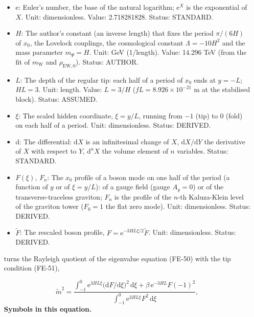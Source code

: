 \documentclass[
  10pt,
]{article}
\providecommand{\tightlist}{%
  \setlength{\itemsep}{0pt}\setlength{\parskip}{0pt}}
\begin{document}
\begin{itemize}
\tightlist
\item
  \(\mathrm{e}\): Euler's number, the base of the natural logarithm;
  \(\mathrm{e}^{X}\) is the exponential of \(X\). Unit: dimensionless.
  Value: 2.718281828. Status: STANDARD.
\item
  \(H\): The author's constant (an inverse length) that fixes the period
  \(\pi/(6H)\) of \(x_0\), the Lovelock couplings, the cosmological
  constant \(\Lambda = -10H^2\) and the mass parameter \(m_\Psi = H\).
  Unit: GeV (1/length). Value: 14.296 TeV (from the fit of
  \(m_{\mathrm{W}}\) and \(\rho_{\mathrm{EW},0}\)). Status: AUTHOR.
\item
  \(L\): The depth of the regular tip: each half of a period of \(x_0\)
  ends at \(y = -L\); \(HL = 3\). Unit: length. Value: \(L = 3/H\)
  (\(fL = 8.926\times10^{-21}\) m at the stabilised block). Status:
  ASSUMED.
\item
  \(\xi\): The scaled hidden coordinate, \(\xi = y/L\), running from
  \(-1\) (tip) to \(0\) (fold) on each half of a period. Unit:
  dimensionless. Status: DERIVED.
\item
  \(\mathrm{d}\): The differential: \(\mathrm{d}X\) is an infinitesimal
  change of \(X\), \(\mathrm{d}X/\mathrm{d}Y\) the derivative of \(X\)
  with respect to \(Y\), \(\mathrm{d}^nX\) the volume element of \(n\)
  variables. Status: STANDARD.
\item
  \(F(\xi),\ F_n\): The \(x_0\) profile of a boson mode on one half of
  the period (a function of \(y\) or of \(\xi = y/L\)): of a gauge field
  (gauge \(A_y = 0\)) or of the transverse-traceless graviton; \(F_n\)
  is the profile of the \(n\)-th Kaluza-Klein level of the graviton
  tower (\(F_0 = 1\) the flat zero mode). Unit: dimensionless. Status:
  DERIVED.
\item
  \(\tilde F\): The rescaled boson profile,
  \(F = \mathrm{e}^{-3HL\xi/2}\tilde F\). Unit: dimensionless. Status:
  DERIVED.
\end{itemize}

turns the Rayleigh quotient of the eigenvalue equation (FE-50) with the
tip condition (FE-51),

\[ \tilde m^2 = \frac{\int_{-1}^{0}\mathrm{e}^{3HL\xi}\big(\mathrm{d}F/\mathrm{d}\xi\big)^2\,\mathrm{d}\xi + \beta\,\mathrm{e}^{-3HL}F(-1)^2}{\int_{-1}^{0}\mathrm{e}^{3HL\xi}F^2\,\mathrm{d}\xi}, \]
\textbf{Symbols in this equation.}
\end{document}
